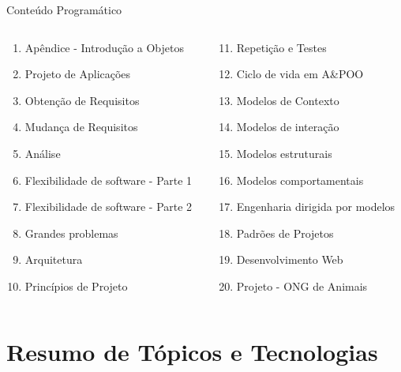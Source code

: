 \documentclass[aspectratio=169]{beamer}
\begin{document}
\begin{frame}{Conteúdo Programático}
\begin{columns}
\begin{column}{0.5\textwidth}
\begin{enumerate}
    \item Apêndice - Introdução a Objetos
    \item Projeto de Aplicações
    \item Obtenção de Requisitos
    \item Mudança de Requisitos
    \item Análise
    \item Flexibilidade de software - Parte 1
    \item Flexibilidade de software - Parte 2
    \item Grandes problemas
    \item Arquitetura
    \item Princípios de Projeto
\end{enumerate}
\end{column}
\begin{column}{0.5\textwidth}
\begin{enumerate}
    \setcounter{enumi}{10}
    \item Repetição e Testes
    \item Ciclo de vida em A\&POO
    \item Modelos de Contexto
    \item Modelos de interação
    \item Modelos estruturais
    \item Modelos comportamentais
    \item Engenharia dirigida por modelos
    \item Padrões de Projetos
    \item Desenvolvimento Web
    \item Projeto - ONG de Animais
\end{enumerate}
\end{column}
\end{columns}
\end{frame}

\section{Resumo de Tópicos e Tecnologias}
\end{document}

